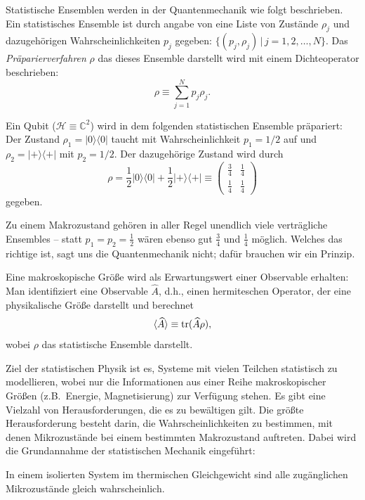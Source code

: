 Statistische Ensemblen werden in der Quantenmechanik wie folgt beschrieben. Ein statistisches Ensemble ist durch angabe von eine Liste von Zustände $\rho_j$ und dazugehörigen Wahrscheinlichkeiten $p_j$ gegeben: $\{(p_j,\rho_j)\,|\, j=1,2, \ldots, N\}$. Das \emph{Präparierverfahren} $\rho$ das dieses Ensemble darstellt wird mit einem Dichteoperator beschrieben:
\begin{equation}
  \rho \equiv \sum_{j=1}^N p_j \rho_j.
\end{equation}

\begin{beispiel}
  Ein Qubit ($\mathcal{H}\equiv \mathbb{C}^2$) wird in dem folgenden statistischen Ensemble präpariert: Der Zustand $\rho_1 = |0\rangle\langle 0|$ taucht mit Wahrscheinlichkeit $p_1=1/2$ auf und $\rho_2 = |+\rangle\langle +|$ mit $p_2 = 1/2$. Der dazugehörige Zustand wird durch
  \begin{equation}
    \rho = \frac12 |0\rangle\langle 0| + \frac12|+\rangle\langle+| \equiv \begin{pmatrix}
      \frac34 & \frac14 \\ \frac14 & \frac14
    \end{pmatrix}
  \end{equation}
  gegeben.
\end{beispiel}

Zu einem Makrozustand gehören in aller Regel unendlich viele verträgliche Ensembles -- statt $p_1 = p_2 = \frac12$ wären ebenso gut $\frac34$ und $\frac14$ möglich. Welches das richtige ist, sagt uns die Quantenmechanik nicht; dafür brauchen wir ein Prinzip.

Eine makroskopische Größe wird als Erwartungswert einer Observable erhalten: Man identifiziert eine Observable $\widehat{A}$, d.h., einen hermiteschen Operator, der eine physikalische Größe darstellt und berechnet
\begin{equation}
  \langle \widehat{A}\rangle \equiv \operatorname{tr}(\widehat{A} \rho),
\end{equation} 
wobei $\rho$ das statistische Ensemble darstellt.

Ziel der statistischen Physik ist es, Systeme mit vielen Teilchen statistisch zu modellieren, wobei nur die Informationen aus einer Reihe makroskopischer Größen (z.B.\ Energie, Magnetisierung) zur Verfügung stehen. Es gibt eine Vielzahl von Herausforderungen, die es zu bewältigen gilt. Die größte Herausforderung besteht darin, die Wahrscheinlichkeiten zu bestimmen, mit denen Mikrozustände bei einem bestimmten Makrozustand auftreten. Dabei wird die Grundannahme der statistischen Mechanik eingeführt:
\begin{center}
\parbox[c][5cm][c]{14cm}{\begin{tcolorbox}[colback=banana,arc=0cm,frame hidden,enhanced]{In einem isolierten System im thermischen Gleichgewicht sind alle zugänglichen Mikrozustände gleich wahrscheinlich.}\end{tcolorbox}}
\end{center}

